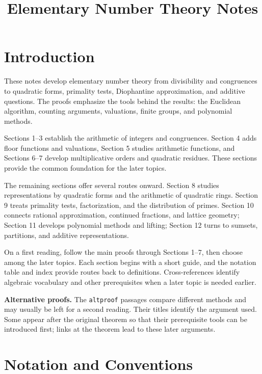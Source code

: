 \documentclass[11pt]{article}
\title{Elementary Number Theory Notes}
\author{}
\date{}
\theoremstyle{ntstyle}
\begin{document}
\maketitle
\newpage
\begingroup
\setlength{\parskip}{0pt}
\tableofcontents
\endgroup
\newpage
\section*{Introduction}

These notes develop elementary number theory from divisibility and congruences
to quadratic forms, primality tests, Diophantine approximation, and additive
questions. The proofs emphasize the tools behind the results: the Euclidean
algorithm, counting arguments, valuations, finite groups, and polynomial methods.

Sections 1--3 establish the arithmetic of integers and congruences. Section 4
adds floor functions and valuations, Section 5 studies arithmetic functions,
and Sections 6--7 develop multiplicative orders and quadratic residues.
These sections provide the common foundation for the later topics.

The remaining sections offer several routes onward. Section 8 studies
representations by quadratic forms and the arithmetic of quadratic rings.
Section 9 treats primality tests, factorization, and the distribution of primes.
Section 10 connects rational approximation, continued fractions, and lattice
geometry; Section 11 develops polynomial methods and lifting; Section 12
turns to sumsets, partitions, and additive representations.

On a first reading, follow the main proofs through Sections 1--7, then choose
among the later topics. Each section begins with a short guide, and the
notation table and index provide routes back to definitions. Cross-references
identify algebraic vocabulary and other prerequisites when a later topic is
needed earlier.

\noindent\textbf{Alternative proofs.} The \texttt{altproof} passages compare
different methods and may usually be left for a second reading. Their titles
identify the argument used. Some appear after the original theorem so that
their prerequisite tools can be introduced first; links at the theorem lead
to these later arguments.

\section*{Notation and Conventions}
\end{document}
